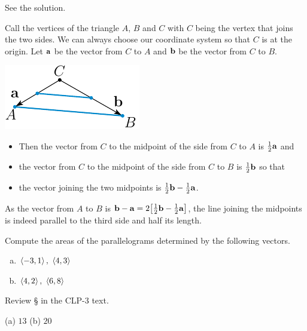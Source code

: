 \begin{answer}
See the solution.
\end{answer}

\begin{solution}
Call the vertices of the triangle $A$, $B$ and $C$ with $C$ being the
vertex that joins the two sides. We can always
choose our coordinate system so that $C$ is at the origin.
Let $\mathbf{a}$ be the vector from $C$ to $A$ 
and $\mathbf{b}$ be the vector from $C$ to $B$.
\begin{center}
     \includegraphics{fig/triangleMidPt.pdf}
\end{center}
\begin{itemize}
\item
Then the vector from $C$ to the midpoint of the side from $C$ to $A$ is
$\tfrac{1}{2}\mathbf{a}$ and
\item
the vector from $C$ to the midpoint of the side from $C$ to $B$ is
$\tfrac{1}{2}\mathbf{b}$ so that
\item
the vector joining the two midpoints is $\tfrac{1}{2}\mathbf{b}-\tfrac{1}{2}\mathbf{a}$. 
\end{itemize}
As the vector from $A$ to $B$ is $\mathbf{b}-\mathbf{a}=2\big[\tfrac{1}{2}\mathbf{b}-\tfrac{1}{2}\mathbf{a}\big]$,
the line joining the midpoints is indeed parallel to the third side
and half its length.
\end{solution}


\begin{question}
Compute the areas of the parallelograms determined by the
following vectors.
\begin{enumerate}[(a)]
\item
$\left< -3,1\right>,\ \left< 4,3\right>$ 
\item
$\left< 4,2\right>,\ \left< 6,8\right>$
\end{enumerate}
\end{question}

\begin{hint}
Review \S{} in the CLP-3 text.
\end{hint}

\begin{answer}
(a) $13$\qquad
(b) $20$
\end{answer}

